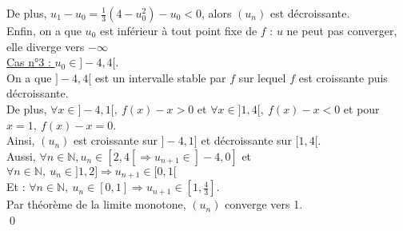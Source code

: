 \documentclass[10pt]{article}
\begin{document}
\begin{tcolorbox}[enhanced, width=7.6in, center, size=fbox, fontupper=\large, drop shadow southwest]
    De plus, $u_1 - u_0 = \frac{1}{3}(4-u_0^2) - u_0 < 0$, alors $(u_n)$ est décroissante.\\
    Enfin, on a que $u_0$ est inférieur à tout point fixe de $f$ : $u$ ne peut pas converger, elle diverge vers $-\infty$\\[0.4cm]
    \underline{Cas n°3 : $u_0 \in ]-4,4[$}.\\
    On a que $]-4,4[$ est un intervalle stable par $f$ sur lequel $f$ est croissante puis décroissante.\\
    De plus, $\forall x\in]-4,1[, ~ f(x)-x > 0$ et $\forall x \in ]1,4[, ~ f(x)-x < 0$ et pour $x=1, ~ f(x)-x=0$.\\
    Ainsi, $(u_n)$ est croissante sur $]-4,1]$ et décroissante sur $[1,4[$.\\
    Aussi, $\forall n\in\mathbb{N}, u_n \in[2,4[ \Rightarrow u_{n+1} \in ]-4,0]$ et $\forall n \in\mathbb{N}, ~ u_n\in ]1,2] \Rightarrow u_{n+1} \in [0,1[$\\
    Et : $\forall n \in\mathbb{N}, ~ u_n \in [0,1] \Rightarrow u_{n+1} \in [1,\frac{4}{3}]$.\\
    Par théorème de la limite monotone, $(u_n)$ converge vers 1.\\
    \qed
\end{tcolorbox}

\end{document}
